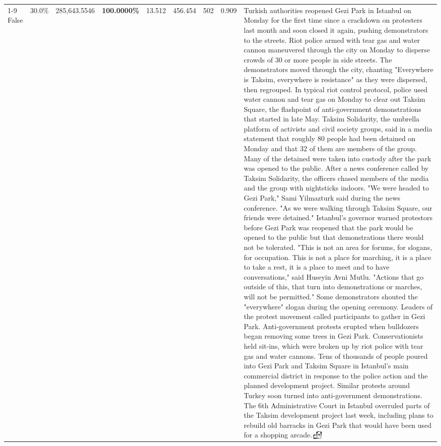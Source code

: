 \begin{table}[H]
\begin{tabular}{lllrlllll}
\cline{1-9}
False & 30.0\% & \color{red} 285,643.5546 & \bfseries \color{red} 100.0000\% & 13.512 & 456.454 & 502 & 0.909 & Turkish authorities reopened Gezi Park in Istanbul on Monday for the first time since a crackdown on protesters last month and soon closed it again, pushing demonstrators to the streets. Riot police armed with tear gas and water cannon maneuvered through the city on Monday to disperse crowds of 30 or more people in side streets. The demonstrators moved through the city, chanting "Everywhere is Taksim, everywhere is resistance" as they were dispersed, then regrouped. In typical riot control protocol, police used water cannon and tear gas on Monday to clear out Taksim Square, the flashpoint of anti-government demonstrations that started in late May. Taksim Solidarity, the umbrella platform of activists and civil society groups, said in a media statement that roughly 80 people had been detained on Monday and that 32 of them are members of the group. Many of the detained were taken into custody after the park was opened to the public. After a news conference called by Taksim Solidarity, the officers chased members of the media and the group with nightsticks indoors. "We were headed to Gezi Park," Sami Yilmazturk said during the news conference. "As we were walking through Taksim Square, our friends were detained." Istanbul's governor warned protestors before Gezi Park was reopened that the park would be opened to the public but that demonstrations there would not be tolerated. "This is not an area for forums, for slogans, for occupation. This is not a place for marching, it is a place to take a rest, it is a place to meet and to have conversations," said Huseyin Avni Mutlu. "Actions that go outside of this, that turn into demonstrations or marches, will not be permitted." Some demonstrators shouted the "everywhere" slogan during the opening ceremony. Leaders of the protest movement called participants to gather in Gezi Park. Anti-government protests erupted when bulldozers began removing some trees in Gezi Park. Conservationists held sit-ins, which were broken up by riot police with tear gas and water cannons. Tens of thousands of people poured into Gezi Park and Taksim Square in Istanbul's main commercial district in response to the police action and the planned development project. Similar protests around Turkey soon turned into anti-government demonstrations. The 6th Administrative Court in Istanbul overruled parts of the Taksim development project last week, including plans to rebuild old barracks in Gezi Park that would have been used for a shopping arcade.𒌸 \\

\end{tabular}
\end{table}
